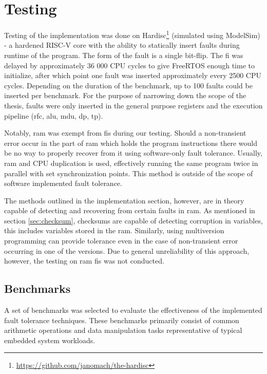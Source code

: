 \section{Testing}

Testing of the implementation was done on Hardisc\footnote{\url{https://github.com/janomach/the-hardisc}} (simulated using ModelSim) - a hardened RISC-V core with the ability to statically insert faults during runtime of the program. The form of the fault is a single bit-flip. The \acrfull{fi} was delayed by approximately 36 000 CPU cycles to give FreeRTOS enough time to initialize, after which point one fault was inserted approximately every 2500 CPU cycles. Depending on the duration of the benchmark, up to 100 faults could be inserted per benchmark. For the purpose of narrowing down the scope of the thesis, faults were only inserted in the general purpose registers and the execution pipeline (\acrshort{rfc}, \acrshort{alu}, \acrshort{mdu}, \acrshort{dp}, \acrshort{tp}).

Notably, \acrfull{ram} was exempt from \acrshort{fi}s during our testing. Should a non-transient error occur in the part of \acrshort{ram} which holds the program instructions there would be no way to properly recover from it using software-only fault tolerance. Usually, \acrshort{ram} and CPU duplication is used, effectively running the same program twice in parallel with set synchronization points. This method is outside of the scope of software implemented fault tolerance.

The methods outlined in the implementation section, however, are in theory capable of detecting and recovering from certain faults in \acrshort{ram}. As mentioned in section \ref{sec:checksum}, checksums are capable of detecting corruption in variables, this includes variables stored in the \acrshort{ram}. Similarly, using multiversion programming can provide tolerance even in the case of non-transient error occurring in one of the versions. Due to general unreliability of this approach, however, the testing on \acrshort{ram} \acrshort{fi}s was not conducted.

\subsection{Benchmarks}

A set of benchmarks was selected to evaluate the effectiveness of the implemented fault tolerance techniques. These benchmarks primarily consist of common arithmetic operations and data manipulation tasks representative of typical embedded system workloads. 

